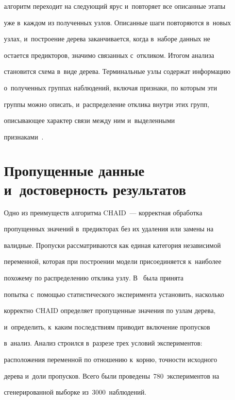 алгоритм переходит на следующий ярус и~повторяет все описанные этапы 


уже в~каждом из полученных узлов. Описанные шаги повторяются в~новых 


узлах, и~построение дерева заканчивается, когда в~наборе данных не 


остается предикторов, значимо связанных с~откликом. Итогом анализа 


становится схема в~виде дерева. Терминальные узлы содержат информацию 


о~полученных группах наблюдений, включая признаки, по которым эти 


группы можно описать, и~распределение отклика внутри этих групп, 


описывающее характер связи между ним и~выделенными  


признаками~\cite{9-ad}. 





\section{Пропущенные данные и~достоверность результатов}


  


  Одно из преимуществ алгоритма CHAID~--- корректная обработка 


пропущенных значений в~предикторах без их удаления или замены на 


валидные. Пропуски рассматриваются как единая категория независимой 


переменной, которая при построении модели присоединяется к~наиболее 


похожему по распределению отклика узлу. В~\cite{10-ad} была принята 


попытка с~помощью статистического эксперимента установить, насколько 


корректно CHAID определяет пропущенные значения по узлам дерева, 


и~определить, к~каким последствиям приводит включение пропусков 


в~анализ. Анализ строился в~разрезе трех условий экспериментов: 


расположения переменной по отношению к~корню, точности исходного 


дерева и~доли пропусков. Всего были проведены~780~экспериментов на 


сгенерированной выборке из~3000~наблюдений. 


